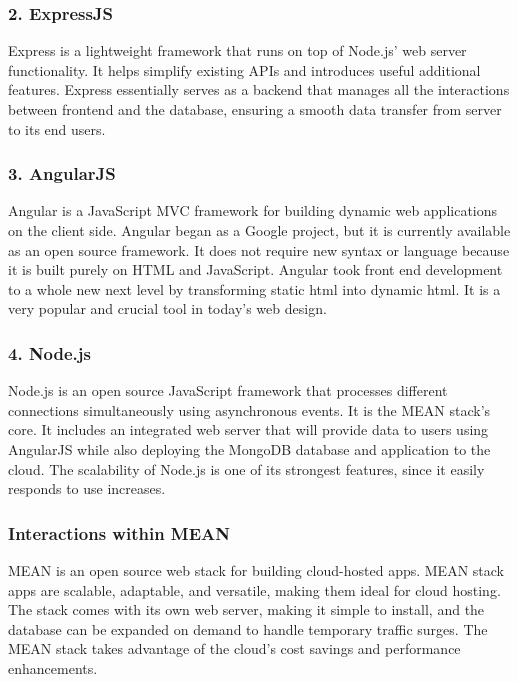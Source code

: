 \documentclass[a4paper, 11pt]{report}
\begin{document}
\subsubsection{2. ExpressJS}
	Express is a lightweight framework that runs on top of Node.js' web server functionality. It helps simplify existing APIs and introduces useful additional features. Express essentially serves as a backend that manages all the interactions between frontend and the database, ensuring a smooth data transfer from server to its end users. \cite{isaac8}

\subsubsection{3. AngularJS}
Angular is a JavaScript MVC framework for building dynamic web applications on the client side. \cite{isaac10} Angular began as a Google project, but it is currently available as an open source framework. \cite{isaac8} It does not require new syntax or language because it is built purely on HTML and JavaScript. Angular took front end development to a whole new next level by transforming static html into dynamic html. It is a very popular and crucial tool in today’s web design. 

\subsubsection{4. Node.js}
Node.js is an open source JavaScript framework that processes different connections simultaneously using asynchronous events.\cite{isaac8}  It is the MEAN stack's core. It includes an integrated web server that will provide data to users using AngularJS while also deploying the MongoDB database and application to the cloud.\cite{isaac8} The scalability of Node.js is one of its strongest features, since it easily responds to use increases.

\subsubsection{Interactions within MEAN}
MEAN is an open source web stack for building cloud-hosted apps. MEAN stack apps are scalable, adaptable, and versatile, making them ideal for cloud hosting.\cite{isaac8} The stack comes with its own web server, making it simple to install, and the database can be expanded on demand to handle temporary traffic surges. \cite{isaac8} The MEAN stack takes advantage of the cloud's cost savings and performance enhancements.\cite{isaac8} 
\end{document}
